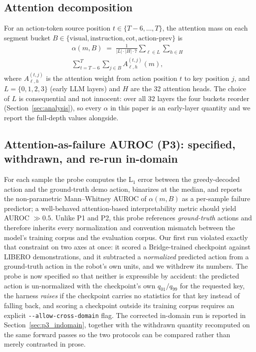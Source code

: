 \documentclass{article}
\begin{document}
\subsection{Attention decomposition}
For an action-token source position $t \in \{T-6, \dots, T\}$, the attention mass on each segment bucket $B \in \{\text{visual}, \text{instruction}, \text{cot}, \text{action-prev}\}$ is
\begin{equation}
\begin{split}
\alpha(m, B) \;=\; \frac{1}{|L|\cdot|H|\cdot 7}
\sum_{\ell \in L}\sum_{h \in H}\\
\sum_{t=T-6}^{T}\sum_{j \in B} A_{\ell,h}^{(t,j)}(m),
\end{split}
\label{eq:attn}
\end{equation}
where $A_{\ell,h}^{(t,j)}$ is the attention weight from action position $t$ to key position $j$, and $L = \{0,1,2,3\}$ (early LLM layers) and $H$ are the 32 attention heads. The choice of $L$ is consequential and not innocent: over all $32$ layers the four buckets reorder (Section~\ref{sec:analysis}), so every $\alpha$ in this paper is an early-layer quantity and we report the full-depth values alongside.

\subsection{Attention-as-failure AUROC (P3): specified, withdrawn, and re-run in-domain}
For each sample the probe computes the L$_1$ error between the greedy-decoded action and the ground-truth demo action, binarizes at the median, and reports the non-parametric Mann--Whitney AUROC of $\alpha(m, B)$ as a per-sample failure predictor; a well-behaved attention-based interpretability metric should yield AUROC $\gg 0.5$. Unlike P1 and P2, this probe references \emph{ground-truth} actions and therefore inherits every normalization and convention mismatch between the model's training corpus and the evaluation corpus. Our first run violated exactly that constraint on two axes at once: it scored a Bridge-trained checkpoint against LIBERO demonstrations, and it subtracted a \emph{normalized} predicted action from a ground-truth action in the robot's own units, and we withdrew its numbers. The probe is now specified so that neither is expressible by accident: the predicted action is un-normalized with the checkpoint's own $q_{01}/q_{99}$ for the requested key, the harness \emph{raises} if the checkpoint carries no statistics for that key instead of falling back, and scoring a checkpoint outside its training corpus requires an explicit \texttt{-{}-allow-cross-domain} flag. The corrected in-domain run is reported in Section~\ref{sec:p3_indomain}, together with the withdrawn quantity recomputed on the same forward passes so the two protocols can be compared rather than merely contrasted in prose.
\end{document}
